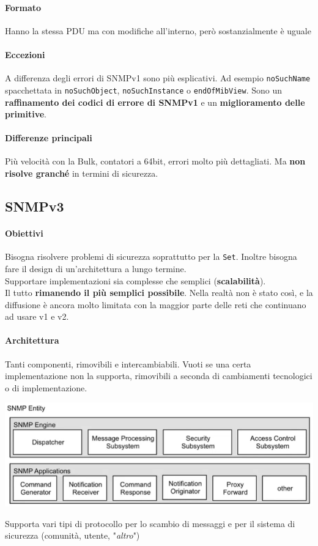 \documentclass[10pt]{book}
\begin{document}
\paragraph{Formato} Hanno la stessa PDU ma con modifiche all'interno, però sostanzialmente è uguale
\paragraph{Eccezioni} A differenza degli errori di SNMPv1 sono più esplicativi. Ad esempio \texttt{noSuchName} spacchettata in \texttt{noSuchObject}, \texttt{noSuchInstance} o \texttt{endOfMibView}. Sono un \textbf{raffinamento dei codici di errore di SNMPv1} e un \textbf{miglioramento delle primitive}.
\paragraph{Differenze principali} Più velocità con la Bulk, contatori a 64bit, errori molto più dettagliati. Ma \textbf{non risolve granché} in termini di sicurezza.
\subsection{SNMPv3}
\paragraph{Obiettivi} Bisogna risolvere problemi di sicurezza soprattutto per la \texttt{Set}. Inoltre bisogna fare il design di un'architettura a lungo termine.\\
Supportare implementazioni sia complesse che semplici (\textbf{scalabilità}).\\
Il tutto \textbf{rimanendo il più semplici possibile}. Nella realtà non è stato così, e la diffusione è ancora molto limitata con la maggior parte delle reti che continuano ad usare v1 e v2.
\paragraph{Architettura} Tanti componenti, rimovibili e intercambiabili. Vuoti se una certa implementazione non la supporta, rimovibili a seconda di cambiamenti tecnologici o di implementazione.
\begin{center}
	\includegraphics[scale=0.75]{snmp3.png}
\end{center}
Supporta vari tipi di protocollo per lo scambio di messaggi e per il sistema di sicurezza (comunità, utente, "\textit{altro}")
\end{document}
